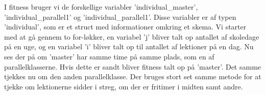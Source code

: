 I fitness bruger vi de forskellige variabler ’individual\_master’, ’individual\_parallel1’ og ’individual\_parallel1’. Disse variabler er af typen ’individual’, som er et struct med informationer omkring et skema.
Vi starter med at gå gennem to for-løkker, en variabel ’j’ bliver talt op antallet af skoledage på en uge, og en variabel ’i’ bliver talt op til antallet af lektioner på en dag. Nu ses der på om ’master’ har samme time på samme plads, som en af parallelklasserne. Hvis dette er sandt bliver fitness talt op på ’master’. Det samme tjekkes nu om den anden parallelklasse. 
Der bruges stort set samme metode for at tjekke om lektionerne sidder i streg, om der er fritimer i midten samt andre.
